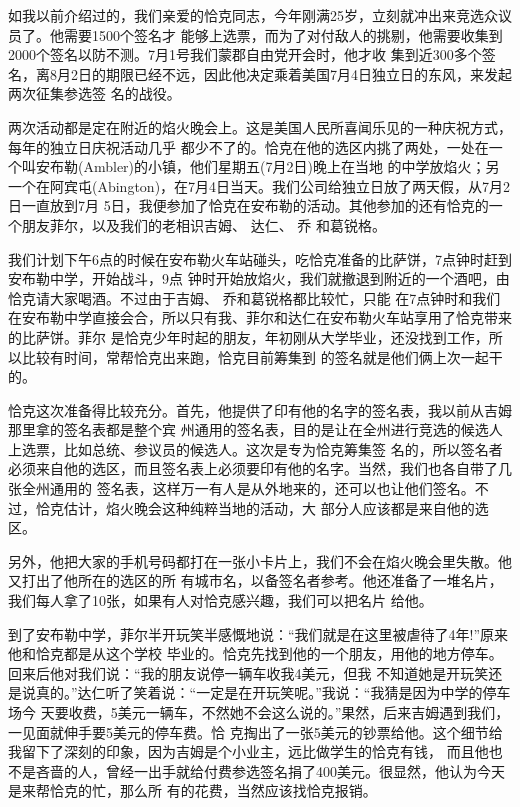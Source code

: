 ﻿\documentclass[11pt]{article}
\begin{document}
如我以前介绍过的，我们亲爱的恰克同志，今年刚满25岁，立刻就冲出来竞选众议员了。他需要1500个签名才
能够上选票，而为了对付敌人的挑剔，他需要收集到2000个签名以防不测。7月1号我们蒙郡自由党开会时，他才收
集到近300多个签名，离8月2日的期限已经不远，因此他决定乘着美国7月4日独立日的东风，来发起两次征集参选签
名的战役。

两次活动都是定在附近的焰火晚会上。这是美国人民所喜闻乐见的一种庆祝方式，每年的独立日庆祝活动几乎
都少不了的。恰克在他的选区内挑了两处，一处在一个叫安布勒(Ambler)的小镇，他们星期五(7月2日)晚上在当地
的中学放焰火；另一个在阿宾屯(Abington)，在7月4日当天。我们公司给独立日放了两天假，从7月2日一直放到7月
5日，我便参加了恰克在安布勒的活动。其他参加的还有恰克的一个朋友菲尔，以及我们的老相识吉姆、 达仁、 乔
和葛锐格。

我们计划下午6点的时候在安布勒火车站碰头，吃恰克准备的比萨饼，7点钟时赶到安布勒中学，开始战斗，9点
钟时开始放焰火，我们就撤退到附近的一个酒吧，由恰克请大家喝酒。不过由于吉姆、 乔和葛锐格都比较忙，只能
在7点钟时和我们在安布勒中学直接会合，所以只有我、菲尔和达仁在安布勒火车站享用了恰克带来的比萨饼。菲尔
是恰克少年时起的朋友，年初刚从大学毕业，还没找到工作，所以比较有时间，常帮恰克出来跑，恰克目前筹集到
的签名就是他们俩上次一起干的。

恰克这次准备得比较充分。首先，他提供了印有他的名字的签名表，我以前从吉姆那里拿的签名表都是整个宾
州通用的签名表，目的是让在全州进行竞选的候选人上选票，比如总统、参议员的候选人。这次是专为恰克筹集签
名的，所以签名者必须来自他的选区，而且签名表上必须要印有他的名字。当然，我们也各自带了几张全州通用的
签名表，这样万一有人是从外地来的，还可以也让他们签名。不过，恰克估计，焰火晚会这种纯粹当地的活动，大
部分人应该都是来自他的选区。

另外，他把大家的手机号码都打在一张小卡片上，我们不会在焰火晚会里失散。他又打出了他所在的选区的所
有城市名，以备签名者参考。他还准备了一堆名片，我们每人拿了10张，如果有人对恰克感兴趣，我们可以把名片
给他。

到了安布勒中学，菲尔半开玩笑半感慨地说：``我们就是在这里被虐待了4年!''原来他和恰克都是从这个学校
毕业的。恰克先找到他的一个朋友，用他的地方停车。回来后他对我们说：``我的朋友说停一辆车收我4美元，但我
不知道她是开玩笑还是说真的。''达仁听了笑着说：``一定是在开玩笑呢。''我说：``我猜是因为中学的停车场今
天要收费，5美元一辆车，不然她不会这么说的。''果然，后来吉姆遇到我们，一见面就伸手要5美元的停车费。恰
克掏出了一张5美元的钞票给他。这个细节给我留下了深刻的印象，因为吉姆是个小业主，远比做学生的恰克有钱，
而且他也不是吝啬的人，曾经一出手就给付费参选签名捐了400美元。很显然，他认为今天是来帮恰克的忙，那么所
有的花费，当然应该找恰克报销。
\end{document}

